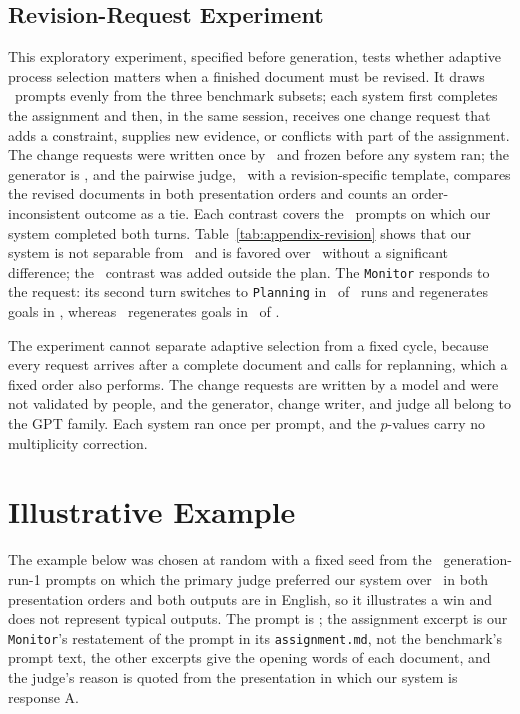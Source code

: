 \subsection{Revision-Request Experiment}
\label{app:revision-requests}
This exploratory experiment, specified before generation, tests whether adaptive process selection matters when a finished document must be revised.
It draws \RevisionPrompts\ prompts evenly from the three benchmark subsets; each system first completes the assignment and then, in the same session, receives one change request that adds a constraint, supplies new evidence, or conflicts with part of the assignment.
The change requests were written once by \modelJudgeBare\ and frozen before any system ran; the generator is \modelGen, and the pairwise judge, \modelJudge\ with a revision-specific template, compares the revised documents in both presentation orders and counts an order-inconsistent outcome as a tie.
Each contrast covers the \RevisionFullFixedOrderN\ prompts on which our system completed both turns.
Table~\ref{tab:appendix-revision} shows that our system is not separable from \condFixedOrder\ and is favored over \condStaged\ without a significant difference; the \condSinglePass\ contrast was added outside the plan.
The \texttt{Monitor} responds to the request: its second turn switches to \texttt{Planning} in \RevisionAfourPlanning\ of \RevisionAfourCompleted\ runs and regenerates goals in \RevisionAfourRegenerated, whereas \condFixedOrder\ regenerates goals in \RevisionAsixRegenerated\ of \RevisionAsixCompleted.

The experiment cannot separate adaptive selection from a fixed cycle, because every request arrives after a complete document and calls for replanning, which a fixed order also performs.
The change requests are written by a model and were not validated by people, and the generator, change writer, and judge all belong to the GPT family.
Each system ran once per prompt, and the $p$-values carry no multiplicity correction.


\section{Illustrative Example}
\label{app:example}
The example below was chosen at random with a fixed seed from the \ExampleEligiblePrompts\ generation-run-1 prompts on which the primary judge preferred our system over \condStaged\ in both presentation orders and both outputs are in English, so it illustrates a win and does not represent typical outputs.
The prompt is \texttt{\ExamplePrompt}; the assignment excerpt is our \texttt{Monitor}'s restatement of the prompt in its \texttt{assignment.md}, not the benchmark's prompt text, the other excerpts give the opening words of each document, and the judge's reason is quoted from the presentation in which our system is response A.


